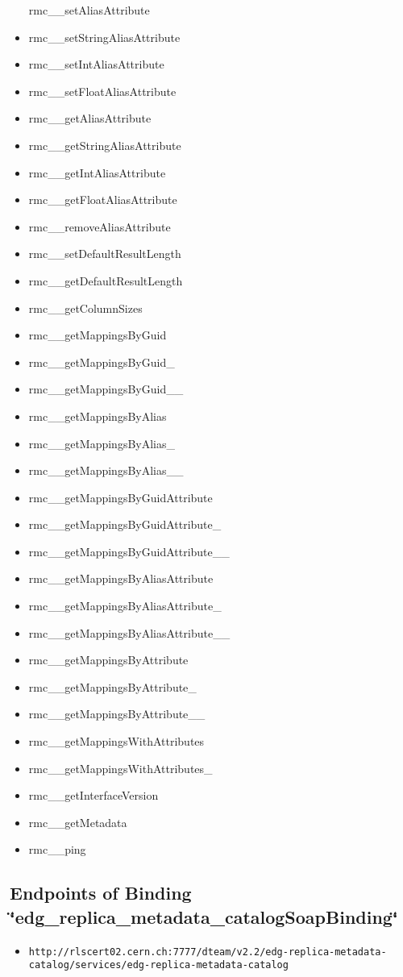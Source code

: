 \begin{itemize}
rmc\_\-\_\-set\-Alias\-Attribute\item rmc\_\-\_\-set\-String\-Alias\-Attribute\item rmc\_\-\_\-set\-Int\-Alias\-Attribute\item rmc\_\-\_\-set\-Float\-Alias\-Attribute\item rmc\_\-\_\-get\-Alias\-Attribute\item rmc\_\-\_\-get\-String\-Alias\-Attribute\item rmc\_\-\_\-get\-Int\-Alias\-Attribute\item rmc\_\-\_\-get\-Float\-Alias\-Attribute\item rmc\_\-\_\-remove\-Alias\-Attribute\item rmc\_\-\_\-set\-Default\-Result\-Length\item rmc\_\-\_\-get\-Default\-Result\-Length\item rmc\_\-\_\-get\-Column\-Sizes\item rmc\_\-\_\-get\-Mappings\-By\-Guid\item rmc\_\-\_\-get\-Mappings\-By\-Guid\_\-\item rmc\_\-\_\-get\-Mappings\-By\-Guid\_\-\_\-\item rmc\_\-\_\-get\-Mappings\-By\-Alias\item rmc\_\-\_\-get\-Mappings\-By\-Alias\_\-\item rmc\_\-\_\-get\-Mappings\-By\-Alias\_\-\_\-\item rmc\_\-\_\-get\-Mappings\-By\-Guid\-Attribute\item rmc\_\-\_\-get\-Mappings\-By\-Guid\-Attribute\_\-\item rmc\_\-\_\-get\-Mappings\-By\-Guid\-Attribute\_\-\_\-\item rmc\_\-\_\-get\-Mappings\-By\-Alias\-Attribute\item rmc\_\-\_\-get\-Mappings\-By\-Alias\-Attribute\_\-\item rmc\_\-\_\-get\-Mappings\-By\-Alias\-Attribute\_\-\_\-\item rmc\_\-\_\-get\-Mappings\-By\-Attribute\item rmc\_\-\_\-get\-Mappings\-By\-Attribute\_\-\item rmc\_\-\_\-get\-Mappings\-By\-Attribute\_\-\_\-\item rmc\_\-\_\-get\-Mappings\-With\-Attributes\item rmc\_\-\_\-get\-Mappings\-With\-Attributes\_\-\item rmc\_\-\_\-get\-Interface\-Version\item rmc\_\-\_\-get\-Metadata\item rmc\_\-\_\-ping\end{itemize}
\subsection{Endpoints of Binding  \char`\"{}edg\_\-replica\_\-metadata\_\-catalog\-Soap\-Binding\char`\"{}}\label{edg_replica_metadata_catalogSoapBinding_edg_replica_metadata_catalogSoapBinding_ports}
\begin{itemize}
\item \tt{http://rlscert02.cern.ch:7777/dteam/v2.2/edg-replica-metadata-catalog/services/edg-replica-metadata-catalog} \end{itemize}
